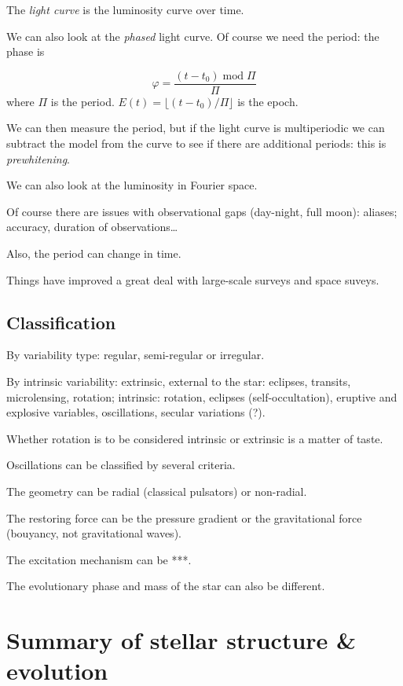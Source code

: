 \documentclass[main.tex]{subfiles}
\begin{document}
The \emph{light curve} is the luminosity curve over time.

We can also look at the \emph{phased} light curve. Of course we need the period:
the phase is

\begin{equation}
    \varphi = \frac{(t-t_0) \operatorname{mod} \Pi}{\Pi}
\end{equation}
%
where \(\Pi\) is the period.
\(E(t) = \lfloor (t-t_0 )/ \Pi \rfloor\) is the epoch.

We can then measure the period, but if the light curve is multiperiodic we can subtract the model from the curve to see if there are additional periods: this is \emph{prewhitening}.

We can also look at the luminosity in Fourier space.

Of course there are issues with observational gaps (day-night, full moon): aliases; accuracy, duration of observations\dots

Also, the period can change in time.

Things have improved a great deal with large-scale surveys and space suveys.

\subsection{Classification}

By variability type: regular, semi-regular or irregular.

By intrinsic variability: extrinsic, external to the star: eclipses, transits, microlensing, rotation; intrinsic: rotation, eclipses (self-occultation), eruptive and explosive variables, oscillations, secular variations (?).

Whether rotation is to be considered intrinsic or extrinsic is a matter of taste.

Oscillations can be classified by several criteria.

The geometry can be  radial (classical pulsators) or non-radial.

The restoring force can be the pressure gradient or the gravitational force (bouyancy, not gravitational waves).

The excitation mechanism can be ***.

The evolutionary phase and mass of the star can also be different.

\section{Summary of stellar structure \& evolution}
\end{document}
